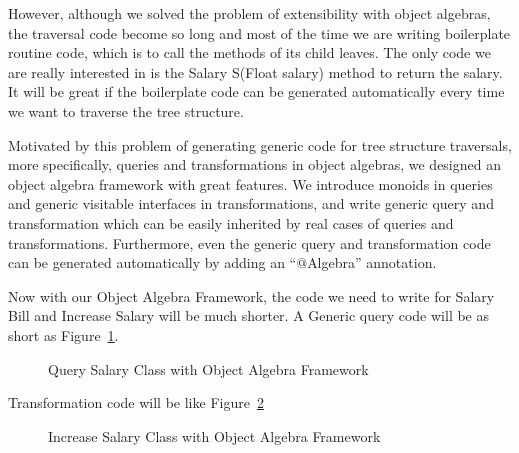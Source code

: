 However, although we solved the problem of extensibility with object algebras, the traversal code become so long and most of the time we are writing boilerplate routine code, which is to call the methods of its child leaves. The only code we are really interested in is the Salary S(Float salary) method to return the salary. It will be great if the boilerplate code can be generated automatically every time we want to traverse the tree structure. 

Motivated by this problem of generating generic code for tree structure traversals, more specifically, queries and transformations in object algebras, we designed an object algebra framework with great features. We introduce monoids in queries and generic visitable interfaces in transformations, and write generic query and transformation which can be easily inherited by real cases of queries and transformations. Furthermore, even the generic query and transformation code can be generated automatically by adding an ``$@$Algebra'' annotation. 

Now with our Object Algebra Framework, the code we need to write for Salary Bill and Increase Salary will be much shorter. A Generic query code will be as short as Figure~\ref{query_with_oaframework}. 
\begin{figure}[tb]
\vspace{-.1in}
\caption{Query Salary Class with Object Algebra Framework}
\label{query_with_oaframework}
\end{figure}
Transformation code will be like Figure~\ref{transform_with_oaframework}
\begin{figure}[tb]
\vspace{-.1in}
\caption{Increase Salary Class with Object Algebra Framework}
\label{transform_with_oaframework}
\end{figure}